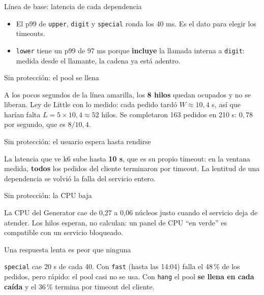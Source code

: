\documentclass[institutional,screen,none]{ua-engineering-v6-beamer}
\begin{document}
\begin{frame}{Línea de base: latencia de cada dependencia}

\begin{itemize}\small
\item El p99 de \texttt{upper}, \texttt{digit} y \texttt{special} ronda los 40 ms. Es el dato para elegir los timeouts.
\item \texttt{lower} tiene un p99 de 97 ms porque \textbf{incluye} la llamada interna a \texttt{digit}: medida desde el llamante, la cadena ya está adentro.
\end{itemize}
\end{frame}


\begin{frame}{Sin protección: el pool se llena}

{\footnotesize A los pocos segundos de la línea amarilla, los \textbf{8 hilos} quedan ocupados y no se liberan. Ley de Little con lo medido: cada pedido tardó $W \approx 10{,}4$ s, así que harían falta $L = 5 \times 10{,}4 \approx 52$ hilos. Se completaron 163 pedidos en 210 s: $0{,}78$ por segundo, que es $8 / 10{,}4$.}
\end{frame}

\begin{frame}{Sin protección: el usuario espera hasta rendirse}

{\footnotesize La latencia que ve k6 sube hasta \textbf{10 s}, que es su propio timeout: en la ventana medida, \textbf{todos} los pedidos del cliente terminaron por timeout. La lentitud de una dependencia se volvió la falla del servicio entero.}
\end{frame}

\begin{frame}{Sin protección: la CPU baja}

{\footnotesize La CPU del Generator cae de 0,27 a 0,06 núcleos justo cuando el servicio deja de atender. Los hilos esperan, no calculan: un panel de CPU ``en verde'' es compatible con un servicio bloqueado.}
\end{frame}

\begin{frame}{Una respuesta lenta es peor que ninguna}

{\footnotesize \texttt{special} cae 20 s de cada 40. Con \texttt{fast} (hasta las 14:04) falla el 48\,\% de los pedidos, pero rápido: el pool casi no se usa. Con \texttt{hang} el pool \textbf{se llena en cada caída} y el 36\,\% termina por timeout del cliente.}
\end{frame}
\end{document}
